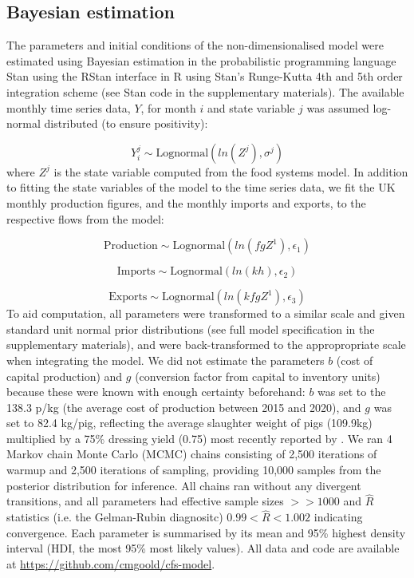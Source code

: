 \documentclass[12pt]{article}
\begin{document}
\subsection{Bayesian estimation}
The parameters and initial conditions of the non-dimensionalised model were estimated using Bayesian estimation in the probabilistic programming language Stan \cite{carpenter2017} using the RStan interface in R \cite{stan2019,rcoreteam2020} using Stan's Runge-Kutta 4th and 5th order integration scheme (see Stan code in the supplementary materials). The available monthly time series data, $Y$, for month $i$ and state variable $j$ was assumed log-normal distributed (to ensure positivity):

\begin{equation}
  Y_{i}^{j} \sim \text{Lognormal}( ln( Z^{j} ), \sigma^{j})
\end{equation}
%
where $Z^{j}$ is the state variable computed from the food systems model. In addition to fitting the state variables of the model to the time series data, we fit the UK monthly production figures, and the monthly imports and exports, to the respective flows from the model:

\begin{equation}
  \text{Production} \sim \text{Lognormal}( ln( f g Z^{1} ), \epsilon_{1})
\end{equation}

\begin{equation}
  \text{Imports} \sim \text{Lognormal}( ln( k h ), \epsilon_{2})
\end{equation}

\begin{equation}
  \text{Exports} \sim \text{Lognormal}( ln( k f g Z^{1} ), \epsilon_{3})
\end{equation}
%
To aid computation, all parameters were transformed to a similar scale and given standard unit normal prior distributions (see full model specification in the supplementary materials), and were back-transformed to the appropropriate scale when integrating the model. We did not estimate the parameters $b$ (cost of capital production) and $g$ (conversion factor from capital to inventory units) because these were known with enough certainty beforehand: $b$ was set to the 138.3 p/kg (the average cost of production between 2015 and 2020), and $g$ was set to 82.4 kg/pig, reflecting the average slaughter weight of pigs (109.9kg) multiplied by a 75\% dressing yield (0.75) most recently reported by \cite{AHDBpocketbook2018}. We ran 4 Markov chain Monte Carlo (MCMC) chains consisting of 2,500 iterations of warmup and 2,500 iterations of sampling, providing 10,000 samples from the posterior distribution for inference. All chains ran without any divergent transitions, and all parameters had effective sample sizes $>> 1000$ and $\hat{R}$ statistics (i.e. the Gelman-Rubin diagnositc) $0.99 < \hat{R} < 1.002$ indicating convergence. Each parameter is summarised by its mean and 95\% highest density interval (HDI, the most 95\% most likely values). All data and code are available at \href{https://github.com/cmgoold/cfs-model}{https://github.com/cmgoold/cfs-model}.
\end{document}
